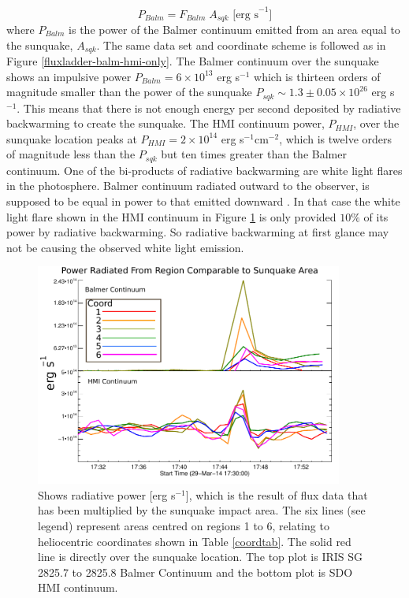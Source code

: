 \begin{equation}
P_{Balm} = F_{Balm} \; A_{sqk}  \text{ [erg s}^{-1}]
\end{equation}\label{Pbalm}
\noindent
where $P_{Balm}$ is the power of the Balmer continuum emitted from an area equal to the sunquake, $A_{sqk}$. The same data set and coordinate scheme is followed as in Figure \ref{fluxladder-balm-hmi-only}. The Balmer continuum over the sunquake shows an impulsive power $P_{Balm} = 6{\times}10^{13}$ erg s$^{-1}$ which is thirteen orders of magnitude smaller than the power of the sunquake $P_{sqk} \sim 1.3\pm0.05{\times}10^{26}$ erg s$^{-1}$. This means that there is not enough energy per second deposited by radiative backwarming to create the sunquake. The HMI continuum power, $P_{HMI}$, over the sunquake location peaks at $P_{HMI} = 2{\times}10^{14}$ erg s$^{-1}$cm$^{-2}$, which is twelve orders of magnitude less than the $P_{sqk}$ but ten times greater than the Balmer continuum. One of the bi-products of radiative backwarming are white light flares in the photosphere. Balmer continuum radiated outward to the observer, is supposed to be equal in power to that emitted downward \citep{1989SoPh..124..303M}. In that case the white light flare shown in the HMI continuum in Figure \ref{powerladder-balm-hmi-only} is only provided $10\%$ of its power by radiative backwarming. So radiative backwarming at first glance may not be causing the observed white light emission.

\begin{figure}[H]
  \begin{center}
  \includegraphics[width=0.9\textwidth]{29-Mar-14-A_sqk-Power-Ladder-Balm-HMI-Only}
  \end{center}
  \caption{Shows radiative power [erg s$^{-1}$], which is the result of flux data that has been multiplied by the sunquake impact area. The six lines (see legend) represent areas centred on regions 1 to 6, relating to heliocentric coordinates shown in Table \ref{coordtab}. The solid red line is directly over the sunquake location. The top plot is IRIS SG  2825.7 to 2825.8 Balmer Continuum and the bottom plot is SDO HMI continuum.}\label{powerladder-balm-hmi-only}
\end{figure}

